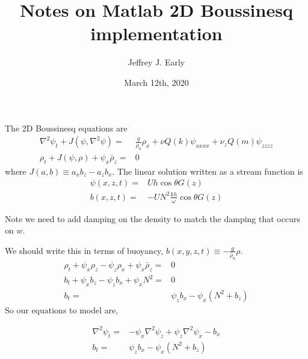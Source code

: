 \documentclass[11pt]{article}
\title{Notes on Matlab 2D Boussinesq implementation}
\author{Jeffrey J. Early}
\date{March 12th, 2020}                                           %
\begin{document}
\maketitle
The 2D Boussinesq equations are
\begin{subequations}{}
\begin{align}
\label{streamfunction_equation}
\nabla^2 \psi_t +  J\left( \psi, \nabla^2 \psi \right) =& \frac{g}{\rho_0}\rho_x + \nu Q(k) \psi_{xxxx} + \nu_z Q(m) \psi_{zzzz} \\ \label{rho_equation}
\rho_t + J\left( \psi, \rho \right) + \psi_x \bar{\rho}_z =& 0
\end{align}
\end{subequations}
where $J(a,b) \equiv a_x b_z - a_z b_x$. The linear solution written as a stream function is
\begin{align}
\label{linear_streamfunction}
\psi(x,z,t) =& U h \cos \theta G(z) \\
b(x,z,t) =& -U N^2 \frac{kh}{\omega} \cos \theta G(z)
\end{align}

Note we need to add damping on the density to match the damping that occurs on $w$.

We should write this in terms of buoyancy, $b(x,y,z,t) \equiv -\frac{g}{\rho_0} \rho$.
\begin{subequations}{}
\begin{align}
\rho_t + \psi_x \rho_z - \psi_z \rho_x + \psi_x \bar{\rho}_z =& 0 \\
b_t + \psi_x b_z - \psi_z b_x + \psi_x N^2 =& 0 \\
b_t =& \psi_z b_x -\psi_x (N^2 + b_z) 
\end{align}
\end{subequations}
So our equations to model are,

\begin{subequations}{}
\begin{align}
\nabla^2 \psi_t =& -  \psi_x \nabla^2 \psi_z + \psi_z \nabla^2 \psi_x  -b_x \\ 
b_t =& \psi_z b_x -\psi_x (N^2 + b_z) 
\end{align}
\end{subequations}
\end{document}

